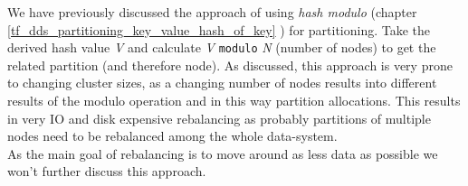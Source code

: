 {
We have previously discussed the approach of using \textit{hash modulo} (chapter \ref{tf_dds_partitioning_key_value_hash_of_key} ) for partitioning. Take the derived hash value \textit{V} and calculate \textit{V} \lstinline{modulo} \textit{N} (number of nodes) to get the related partition (and therefore node). As discussed, this approach is very prone to changing cluster sizes, as a changing number of nodes results into different results of the modulo operation and in this way partition allocations. This results in very IO and disk expensive rebalancing as probably partitions of multiple nodes need to be rebalanced among the whole data-system.\\
As the main goal of rebalancing is to move around as less data as possible we won't further discuss this approach.

}
